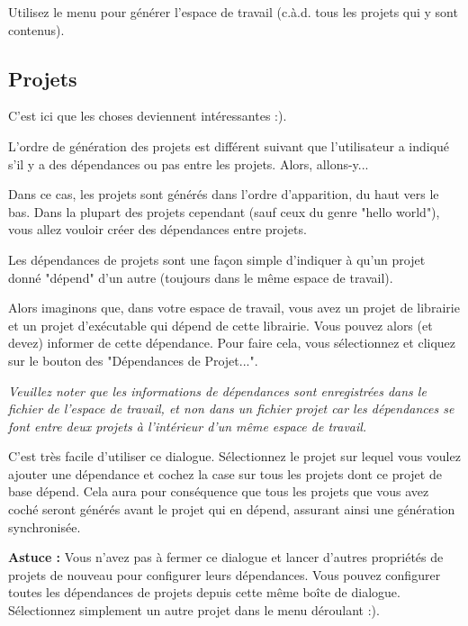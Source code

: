 Utilisez le menu  pour générer l'espace de travail (c.à.d. tous les projets qui y sont contenus). 

\subsection{Projets}

C'est ici que les choses deviennent intéressantes :).

L'ordre de génération des projets est différent suivant que l'utilisateur a indiqué s'il y a des dépendances ou pas entre les projets. Alors, allons-y...


Dans ce cas, les projets sont générés dans l'ordre d'apparition, du haut vers le bas. Dans la plupart des projets cependant (sauf ceux du genre "hello world"), vous allez vouloir créer des dépendances entre projets.


Les dépendances de projets sont une façon simple d'indiquer à \codeblocks qu'un projet donné "dépend" d'un autre (toujours dans le même espace de travail).

Alors imaginons que, dans votre espace de travail, vous avez un projet de librairie et un projet d'exécutable qui dépend de cette librairie. Vous pouvez alors (et devez) informer \codeblocks de cette dépendance. Pour faire cela, vous sélectionnez  et cliquez sur le bouton des  "Dépendances de Projet...".

\textit{Veuillez noter que les informations de dépendances sont enregistrées dans le fichier de l'espace de travail, et non dans un fichier projet car les dépendances se font entre deux projets à l'intérieur d'un même espace de travail.}


C'est très facile d'utiliser ce dialogue. Sélectionnez le projet sur lequel vous voulez ajouter une dépendance et cochez la case sur tous les projets dont ce projet de base dépend. Cela aura pour conséquence que tous les projets que vous avez coché seront générés avant le projet qui en dépend, assurant ainsi une génération synchronisée.

\textbf{Astuce :} Vous n'avez pas à fermer ce dialogue et lancer d'autres propriétés de projets de nouveau pour configurer leurs dépendances. Vous pouvez configurer toutes les dépendances de projets depuis cette même boîte de dialogue. Sélectionnez simplement un autre projet dans le menu déroulant :).

